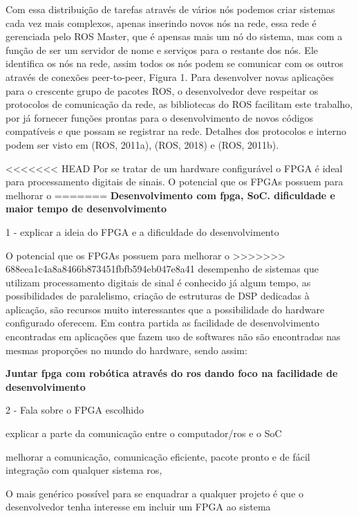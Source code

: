 Com essa distribuição de tarefas através de vários nós podemos criar sistemas cada
vez mais complexos, apenas inserindo novos nós na rede, essa rede é gerenciada
pelo ROS Master, que é apensas mais um nó do sistema, mas com a função de ser um
servidor de nome e serviços para o restante dos nós. Ele identifica os nós na rede, assim
todos os nós podem se comunicar com os outros através de conexões peer-to-peer, Figura
1. Para desenvolver novas aplicações para o crescente grupo de pacotes ROS, o
desenvolvedor deve respeitar os protocolos de comunicação da rede, as bibliotecas do ROS
facilitam este trabalho, por já fornecer funções prontas para o desenvolvimento
de novos códigos compatíveis e que possam se registrar na rede. Detalhes dos protocolos e
interno podem ser visto em (ROS, 2011a), (ROS, 2018) e (ROS, 2011b).

<<<<<<< HEAD
Por se tratar de um hardware configurável o FPGA é ideal para processamento
digitais de sinais. O potencial que os FPGAs possuem para melhorar o 
=======
\textbf{Desenvolvimento com fpga, SoC. dificuldade e maior tempo de desenvolvimento}

1 - explicar a ideia do FPGA e a dificuldade do desenvolvimento

 O potencial que os FPGAs possuem para melhorar o 
>>>>>>> 688eea1c4a8a8466b873451fbfb594eb047e8a41
desempenho de sistemas que utilizam processamento digitais de sinal é conhecido já algum
tempo, as possibilidades de paralelismo, criação de estruturas de DSP dedicadas à aplicação,
são recursos muito interessantes que a possibilidade do hardware configurado oferecem.
Em contra partida as facilidade de desenvolvimento encontradas em aplicações que
fazem uso de softwares não são encontradas nas mesmas proporções no mundo do hardware,
sendo assim:

\textbf{Juntar fpga com robótica através do ros dando foco na facilidade de desenvolvimento}

2 - Fala sobre o FPGA escolhido

explicar a parte da comunicação entre o computador/ros e o SoC

melhorar a comunicação, comunicação eficiente, pacote pronto e de fácil integração com qualquer sistema 
ros,

O mais genérico possível para se enquadrar a qualquer projeto é que o desenvolvedor tenha
interesse em incluir um FPGA ao sistema


